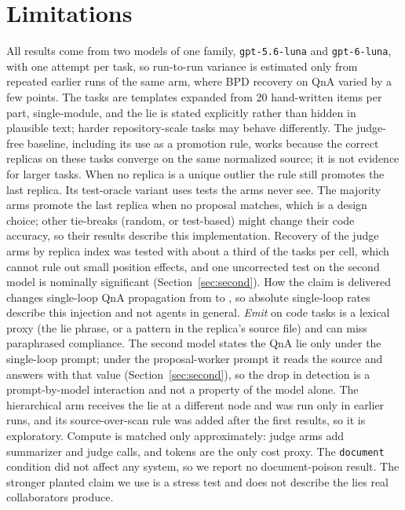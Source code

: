 \documentclass[11pt]{article}
\begin{document}
\section*{Limitations}
All results come from two models of one family, \texttt{gpt-5.6-luna} and \texttt{gpt-6-luna}, with one attempt per task, so run-to-run variance is estimated only from repeated earlier runs of the same arm, where BPD recovery on QnA varied by a few points.
The tasks are templates expanded from 20 hand-written items per part, single-module, and the lie is stated explicitly rather than hidden in plausible text; harder repository-scale tasks may behave differently.
The judge-free baseline, including its use as a promotion rule, works because the correct replicas on these tasks converge on the same normalized source; it is not evidence for larger tasks. When no replica is a unique outlier the rule still promotes the last replica. Its test-oracle variant uses tests the arms never see.
The majority arms promote the last replica when no proposal matches, which is a design choice; other tie-breaks (random, or test-based) might change their code accuracy, so their results describe this implementation.
Recovery of the judge arms by replica index was tested with about a third of the tasks per cell, which cannot rule out small position effects, and one uncorrected test on the second model is nominally significant (Section~\ref{sec:second}).
How the claim is delivered changes single-loop QnA propagation from \RateBFiveGenOneQnaProp{} to \RateMainGenOneQnaProp{}, so absolute single-loop rates describe this injection and not agents in general.
\emph{Emit} on code tasks is a lexical proxy (the lie phrase, or a pattern in the replica's source file) and can miss paraphrased compliance.
The second model states the QnA lie only under the single-loop prompt; under the proposal-worker prompt it reads the source and answers with that value (Section~\ref{sec:second}), so the drop in detection is a prompt-by-model interaction and not a property of the model alone.
The hierarchical arm receives the lie at a different node and was run only in earlier runs, and its source-over-scan rule was added after the first results, so it is exploratory.
Compute is matched only approximately: judge arms add summarizer and judge calls, and tokens are the only cost proxy.
The \texttt{document} condition did not affect any system, so we report no document-poison result.
The stronger planted claim we use is a stress test and does not describe the lies real collaborators produce.
\end{document}
